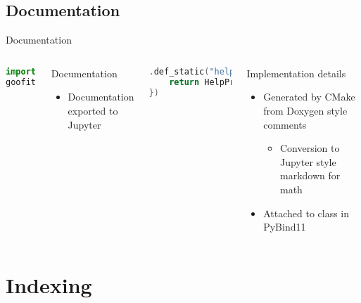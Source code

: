 \documentclass[aspectratio=169, smaller]{beamer}
\begin{document}
\subsection{Documentation}
\begin{frame}[fragile]{Documentation}
    \begin{columns}[c]
        \begin{lstlisting}[language=Python]
import goofit
goofit.MyPdf
        \end{lstlisting}
        \begin{block}{Documentation}
            \begin{itemize}
                \item Documentation exported to Jupyter
            \end{itemize}
        \end{block}
        \begin{lstlisting}[language=C++]
.def_static("help", []() {
    return HelpPrinter(MyPdf_docs);
})
        \end{lstlisting}
        \begin{block}{Implementation details}
            \begin{itemize}
                \item Generated by CMake from Doxygen style comments
                \begin{itemize}
                    \item Conversion to Jupyter style markdown for math
                \end{itemize}
                \item Attached to class in PyBind11
            \end{itemize}
        \end{block}
    \end{columns}
\end{frame}

\section{Indexing}
\end{document}
